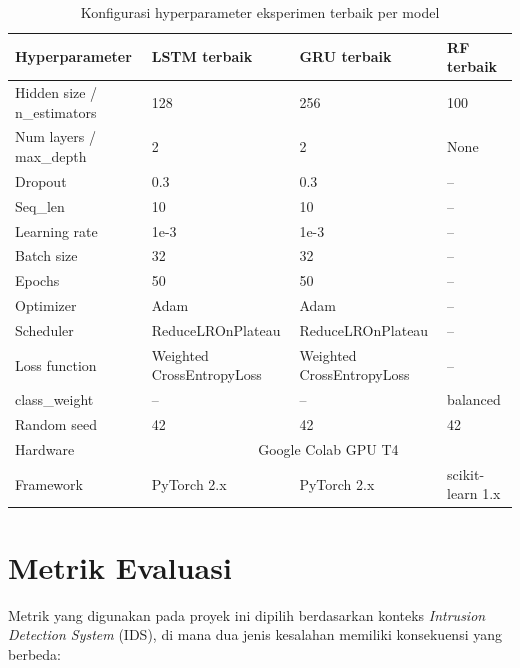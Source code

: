 \documentclass[11pt,a4paper,oneside]{report}
\begin{document}
\begin{table}[h!]
\centering
\caption{Konfigurasi hyperparameter eksperimen terbaik per model}
\label{tab:hyperparam}
\begin{tabular}{llll}
\toprule
\textbf{Hyperparameter} & \textbf{LSTM terbaik} & \textbf{GRU terbaik} & \textbf{RF terbaik} \\
\midrule
Hidden size / n\_estimators & 128         & 256         & 100 \\
Num layers / max\_depth     & 2           & 2           & None \\
Dropout                     & 0.3         & 0.3         & -- \\
Seq\_len                    & 10          & 10          & -- \\
Learning rate               & 1e-3        & 1e-3        & -- \\
Batch size                  & 32          & 32          & -- \\
Epochs                      & 50          & 50          & -- \\
Optimizer                   & Adam        & Adam        & -- \\
Scheduler                   & ReduceLROnPlateau & ReduceLROnPlateau & -- \\
Loss function               & Weighted CrossEntropyLoss & Weighted CrossEntropyLoss & -- \\
class\_weight               & --          & --          & balanced \\
Random seed                 & 42          & 42          & 42 \\
Hardware                    & \multicolumn{3}{c}{Google Colab GPU T4} \\
Framework                   & PyTorch 2.x & PyTorch 2.x & scikit-learn 1.x \\
\bottomrule
\end{tabular}
\end{table}

\section{Metrik Evaluasi}

Metrik yang digunakan pada proyek ini dipilih berdasarkan konteks \textit{Intrusion Detection System} (IDS), di mana dua jenis kesalahan memiliki konsekuensi yang berbeda:
\end{document}
